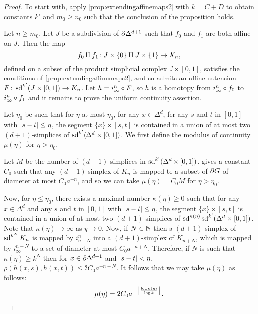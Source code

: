 \documentclass[a4paper]{article}
\begin{document}
\begin{proof}
  To start with, apply \cref{prop:extendingaffinemaps2} with $k = C + D$ to
  obtain constants $k'$ and $m_0\geq n_0$ such that the conclusion of the
  proposition holds. 

  Let $n \geq m_0$.  Let $J$ be a subdivision of $\boundary\Delta^{d+1}$ such
  that $f_0$ and $f_1$ are both affine on $J$. Then the map 
  \begin{equation*}
    f_0 \disjointunion f_1 \from J \times \{0\} \disjointunion J \times \{1\}
          \to K_n,
  \end{equation*}
  defined on a subset of the product simplicial complex $J \times [0,1]$,
  satisfies the conditions of \cref{prop:extendingaffinemaps2}, and so admits
  an affine extension $F \from \sd^{k'} (J \times [0,1]) \to K_n$. Let $h =
  i^n_\infty \composed F$, so $h$ is a homotopy from $i^n_\infty\composed f_0$
  to $i^n_\infty\composed f_1$ and it remains to prove the uniform continuity
  assertion.

  Let $\eta_0$ be such that for $\eta$ at most $\eta_0$, 
  for any $x \in \Delta^d$, for any $s$ and $t$ in $[0,1]$ with
  $\abs{s-t} \leq \eta$, the segment $\{x\} \times [s,t]$ is contained in a
  union of at most two $(d+1)$-simplices of $\sd^{k'}(\Delta^d \times [0,1])$.
  We first define the modulus of continuity $\mu(\eta)$ for $\eta > \eta_0$.

  Let $M$ be the number of $(d+1)$-simplices in $\sd^{k'}(\Delta^d \times
  [0,1])$.   gives a constant $C_0$ such that any
  $(d+1)$-simplex of $K_n$ is mapped to a subset of $\boundary G$ of diameter
  at most $C_0 a^{-n}$, and so we can take $\mu(\eta) = C_0M$ for $\eta >
  \eta_0$.

  Now, for $\eta \leq \eta_0$, there exists a maximal number $\kappa(\eta) \geq
  0$ such that for any $x \in \Delta^d$ and any $s$ and $t$ in $[0,1]$ with
  $\abs{s-t} \leq \eta$, the segment $\{x\} \times [s,t]$ is contained in a
  union of at most two $(d+1)$-simplices of
  $\sd^{\kappa(\eta)}\sd^{k'}(\Delta^d\times[0,1])$. Note that $\kappa(\eta)
  \to \infty$ as $\eta \to 0$. Now, if $N\in\naturals$ then a $(d+1)$-simplex of
  $\sd^{k^N}K_n$ is mapped by $i^n_{n+N}$ into a $(d+1)$-simplex of $K_{n+N}$,
  which is mapped by $i^{n+N}_\infty$ to a set of diameter at most
  $C_0a^{-n+N}$. Therefore, if $N$ is such that $\kappa(\eta) \geq k^N$ then
  for $x \in \boundary\Delta^{d+1}$ and $\abs{s-t} < \eta$, $\rho(h(x,s),
  h(x,t)) \leq 2C_0a^{-n-N}$. It follows that we may take $\mu(\eta)$ as follows:
  \begin{equation*}
    \mu(\eta) = 2C_0 a^{-\floor*{\frac{\log\kappa(\eta)}{\log k}}}.\qedhere
  \end{equation*}
\end{proof}
\end{document}
